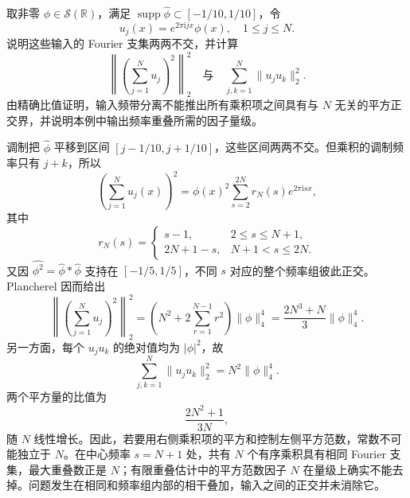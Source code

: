 \begin{optionalexercise}\label{b2:ex:25-new-7}
取非零 \(\phi\in\mathcal S(\mathbb R)\)，满足
\(\operatorname{supp}\widehat\phi\subset[-1/10,1/10]\)，令
\[
 u_j(x)=e^{2\pi\mathrm i jx}\phi(x),
 \quad1\leq j\leq N.
\]
说明这些输入的 Fourier 支集两两不交，并计算
\[
 \left\|\left(\sum_{j=1}^N u_j\right)^2\right\|_2^2
 \quad\text{与}\quad
 \sum_{j,k=1}^N\|u_ju_k\|_2^2.
\]
由精确比值证明，输入频带分离不能推出所有乘积项之间具有与 \(N\) 无关的平方正交界，并说明本例中输出频率重叠所需的因子量级。
\end{optionalexercise}
\begin{solution}
调制把 \(\widehat\phi\) 平移到区间
\([j-1/10,j+1/10]\)，这些区间两两不交。但乘积的调制频率只有 \(j+k\)，所以
\[
 \left(\sum_{j=1}^N u_j(x)\right)^2
       =\phi(x)^2\sum_{s=2}^{2N}r_N(s)e^{2\pi\mathrm i sx},
\]
其中
\[
 r_N(s)=
 \begin{cases}
 s-1,&2\leq s\leq N+1,\\
 2N+1-s,&N+1<s\leq2N.
 \end{cases}
\]
又因 \(\widehat{\phi^2}=\widehat\phi*\widehat\phi\) 支持在
\([-1/5,1/5]\)，不同 \(s\) 对应的整个频率组彼此正交。Plancherel 因而给出
\[
 \left\|\left(\sum_{j=1}^N u_j\right)^2\right\|_2^2
 =\left(N^2+2\sum_{r=1}^{N-1}r^2\right)\|\phi\|_4^4
 =\frac{2N^3+N}{3}\|\phi\|_4^4.
\]
另一方面，每个 \(u_ju_k\) 的绝对值均为 \(|\phi|^2\)，故
\[
 \sum_{j,k=1}^N\|u_ju_k\|_2^2=N^2\|\phi\|_4^4.
\]
两个平方量的比值为
\[
 \frac{2N^2+1}{3N},
\]
随 \(N\) 线性增长。因此，若要用右侧乘积项的平方和控制左侧平方范数，常数不可能独立于 \(N\)。在中心频率 \(s=N+1\) 处，共有 \(N\) 个有序乘积具有相同 Fourier 支集，最大重叠数正是 \(N\)；有限重叠估计中的平方范数因子 \(N\) 在量级上确实不能去掉。问题发生在相同和频率组内部的相干叠加，输入之间的正交并未消除它。
\end{solution}

